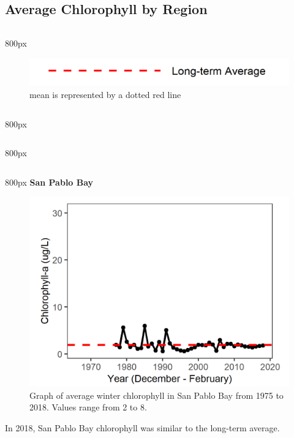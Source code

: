 \documentclass[
]{book}
\begin{document}
\hypertarget{average-chlorophyll-by-region-3}{%
\subsection{Average Chlorophyll by Region}\label{average-chlorophyll-by-region-3}}

\begin{column}{800px\textwidth}
\begin{figure}
\includegraphics[width=15.25in]{figures/mline} \caption{mean is represented by a dotted red line}\label{fig:unnamed-chunk-157}
\end{figure}
\end{column}

\begin{column}{800px\textwidth}
\end{column}

\begin{column}{800px\textwidth}
\end{column}

\begin{column}{800px\textwidth}
\textbf{San Pablo Bay}

\begin{figure}
\includegraphics[width=15.25in]{figures/chla_splwinter} \caption{Graph of average winter chlorophyll in San Pablo Bay from 1975 to 2018. Values range from 2 to 8.}\label{fig:unnamed-chunk-158}
\end{figure}

In 2018, San Pablo Bay chlorophyll was similar to the long-term average.
\end{column}
\end{document}
